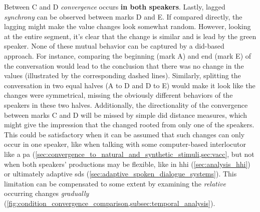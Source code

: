 Between C and D \emph{convergence} occurs \textbf{in both speakers}.
Lastly, lagged \emph{synchrony} can be observed between marks D and E.
If compared directly, the lagging might make the value changes look somewhat random.
However, looking at the entire segment, it's clear that the change is similar and is lead by the green speaker.
None of these mutual behavior can be captured by a \ac{did}-based approach.
For instance, comparing the beginning (mark A) and end (mark E) of the conversation would lead to the conclusion that there was no change in the values (illustrated by the corresponding dashed lines).
Similarly, splitting the conversation in two equal halves (A to D and D to E) would make it look like the changes were symmetrical, missing the obviously different behaviors of the speakers in these two halves.
Additionally, the directionality of the convergence between marks C and D will be missed by simple \ac{did} distance measures, which might give the impression that the changed rooted from only one of the speakers.
This could be satisfactory when it can be assumed that such changes can only occur in one speaker, like when talking with some computer-based interlocutor like a \ac{pa} (\cref{sec:convergence_to_natural_and_synthetic_stimuli,sec:vacc}, but not when both speakers' productions may be flexible, like in \ac{hhi} (\cref{sec:analysis_hhi}) or ultimately adaptive \acl{sds} (\cref{sec:adaptive_spoken_dialogue_systems}).
This limitation can be compensated to some extent by examining the \emph{relative} occurring changes \emph{gradually} (\cref{fig:condition_convergence_comparison,subsec:temporal_analysis}).


